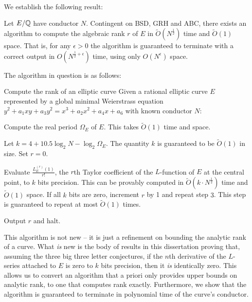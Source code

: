 \documentclass[10pt]{article}
\begin{document}
We establish the following result:
\begin{theorem}\label{thm:main_theorem}
Let $E/\mathbb{Q}$ have conductor $N$. Contingent on BSD, GRH and ABC, there exists an algorithm to compute the algebraic rank $r$ of $E$ in $\tilde{O}(N^{\frac{1}{2}})$ time and $\tilde{O}(1)$ space. That is, for any $\epsilon>0$ the algorithm is guaranteed to terminate with a correct output in $O(N^{\frac{1}{2}+\epsilon})$ time, using only $O(N^{\epsilon})$ space.
\end{theorem}
The algorithm in question is as follows:
\begin{algorithm}{Compute the rank of an elliptic curve}\label{algo:compute_rank}
Given a rational elliptic curve $E$ represented by a global minimal Weierstrass equation $y^2 + a_1 xy + a_3 y^2 = x^3 + a_2 x^2 + a_4 x + a_6$ with known conductor $N$:
\begin{steps}
\item Compute the real period $\Omega_E$ of $E$. This takes $\tilde{O}(1)$ time and space.
\item Let $k = 4 + 10.5 \log_2 N - \log_2 \Omega_E$. The quantity $k$ is guaranteed to be $\tilde{O}(1)$ in size. Set $r=0$.
\item Evaluate $\frac{L_E^{(r)}(1)}{r!}$, the $r$th Taylor coefficient of the $L$-function of $E$ at the central point, to $k$ bits precision. This can be provably computed in $\tilde{O}(k\cdot N^{\frac{1}{2}})$ time and $\tilde{O}(1)$ space. If all $k$ bits are zero, increment $r$ by 1 and repeat step $3$. This step is guaranteed to repeat at most $\tilde{O}(1)$ 	times.
\item Output $r$ and halt.
\end{steps}
\end{algorithm}

This algorithm is not new -- it is just a refinement on bounding the analytic rank of a curve. What {\it is} new is the body of results in this dissertation proving that, assuming the three big three letter conjectures, if the $n$th derivative of the $L$-series attached to $E$ is zero to $k$ bits precision, then it {\it is} identically zero. This allows us to convert an algorithm that a priori only provides upper bounds on analytic rank, to one that computes rank exactly. Furthermore, we show that the algorithm is guaranteed to terminate in polynomial time of the curve's conductor. \\
\end{document}
